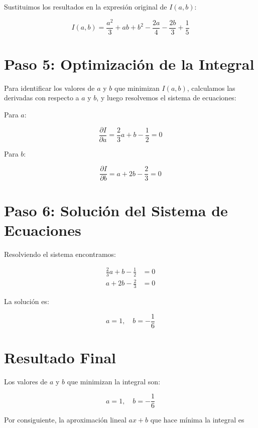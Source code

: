 \documentclass{report}
\begin{document}
Sustituimos los resultados en la expresión original de \( I(a,b) \):

\begin{equation}
I(a,b) = \frac{a^2}{3} + ab + b^2 - \frac{2a}{4} - \frac{2b}{3} + \frac{1}{5}
\end{equation}

\section*{Paso 5: Optimización de la Integral}

Para identificar los valores de \( a \) y \( b \) que minimizan \( I(a,b) \), calculamos las derivadas con respecto a \( a \) y \( b \), y luego resolvemos el sistema de ecuaciones:

Para \( a \):

\begin{equation}
\frac{\partial I}{\partial a} = \frac{2}{3} a + b - \frac{1}{2} = 0
\end{equation}

Para \( b \):

\begin{equation}
\frac{\partial I}{\partial b} = a + 2b - \frac{2}{3} = 0
\end{equation}

\section*{Paso 6: Solución del Sistema de Ecuaciones}

Resolviendo el sistema encontramos:

\begin{align*}
\frac{2}{3} a + b - \frac{1}{2} &= 0 \\
a + 2b - \frac{2}{3} &= 0
\end{align*}

La solución es:

\[
a = 1, \quad b = -\frac{1}{6}
\]

\section*{Resultado Final}

Los valores de \( a \) y \( b \) que minimizan la integral son:

\[
a = 1, \quad b = -\frac{1}{6}
\]

Por consiguiente, la aproximación lineal \( ax + b \) que hace mínima la integral es 
\end{document}

